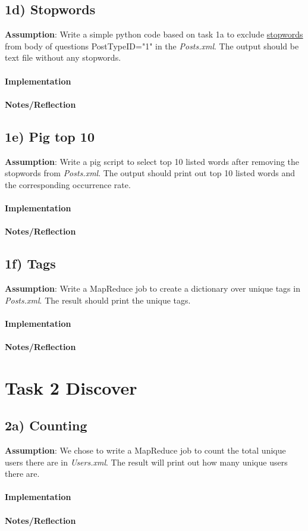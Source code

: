 \documentclass[fleqn,10pt]{wlscirep}
\begin{document}
\subsection*{1d) Stopwords}
\textbf{Assumption}: Write a simple python code based on task 1a to exclude \href{https://raw.githubusercontent.com/naimdjon/stopwords/master/stopwords.txt}{stopwords} from body of questions PostTypeID="1" in the \textit{Posts.xml}. The output should be text file without any stopwords. \\ \\
\textbf{Implementation}  \\ \\
\textbf{Notes/Reflection}



\subsection*{1e) Pig top 10}
\textbf{Assumption}: Write a pig script to select top 10 listed words after removing the stopwords from \textit{Posts.xml}. The output should print out top 10 listed words and the corresponding occurrence rate.\\ \\
\textbf{Implementation}  \\ \\
\textbf{Notes/Reflection}


\subsection*{1f) Tags}
\textbf{Assumption}: Write a MapReduce job to create a dictionary over unique tags in  \textit{Posts.xml}. The result should print the unique tags.\\ \\
\textbf{Implementation}  \\ \\
\textbf{Notes/Reflection}



\section*{Task 2 Discover}

\subsection*{2a) Counting }
\textbf{Assumption}: We chose to write a MapReduce job to count the total unique users there are in \textit{Users.xml}. The result will print out how many unique users there are.\\ \\
\textbf{Implementation}  \\ \\
\textbf{Notes/Reflection}

\end{document}
